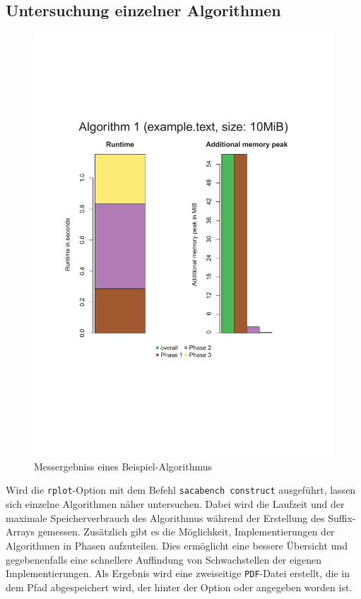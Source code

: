 \subsection{Untersuchung einzelner Algorithmen}
\label{framework:bechmark:sacabench-construct}

\begin{figure}
	\includegraphics[page = 1, width=.5\textwidth]{kapitel/3_framework/benchmark/sacabench-construct/beispiel_construct.pdf}
	\caption{Messergebniss eines Beispiel-Algorithmus}
	\label{pdf:benchmark:construct}
\end{figure}


Wird die \texttt{rplot}-Option mit dem Befehl \texttt{sacabench construct} ausgeführt, lassen sich einzelne Algorithmen näher untersuchen. Dabei wird die Laufzeit und der maximale Speicherverbrauch des Algorithmus während der Erstellung des Suffix-Arrays gemessen. Zusätzlich gibt es die Möglichkeit, Implementierungen der Algorithmen in Phasen aufzuteilen. Dies ermöglicht eine bessere Übersicht und gegebenenfalls eine schnellere Auffindung von Schwachstellen der eigenen Implementierungen.
Als Ergebnis wird eine zweiseitige \texttt{PDF}-Datei erstellt, die in dem Pfad abgespeichert wird, der hinter der Option  oder  angegeben worden ist.

